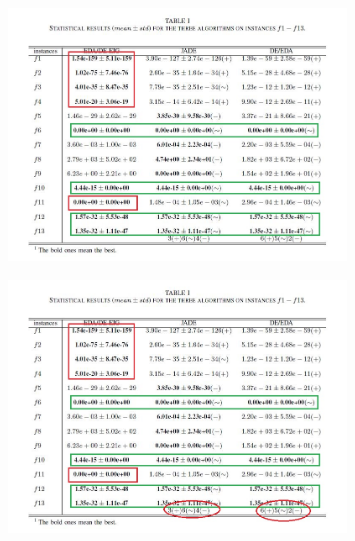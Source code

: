 \documentclass[xcolor=dvipsnames]{beamer}
\begin{document}
    \begin{frame}
    \begin{figure}[H]
        \graphicspath{{figs/}}
        \includegraphics[width=0.8\textwidth]{tab1-2.jpg}
    \end{figure}
    \end{frame}
    
    \begin{frame}
    \begin{figure}[H]
        \graphicspath{{figs/}}
        \includegraphics[width=0.8\textwidth]{tab1-3.jpg}
    \end{figure}
    \end{frame}
\end{document}
